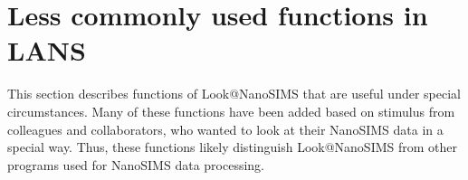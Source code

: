 \documentclass[a4paper, 11pt]{article}
\newcounter{step}
\begin{document}
\newpage


%
%
%
%
%
%
%

\section{Less commonly used functions in LANS}
\label{sec:level3}

This section describes functions of Look@NanoSIMS that are useful under special circumstances. Many of these functions have been added based on stimulus from colleagues and collaborators, who wanted to look at their NanoSIMS data in a special way. Thus, these functions likely distinguish Look@NanoSIMS from other programs used for NanoSIMS data processing.

%

%
%
%
%

\end{document}
